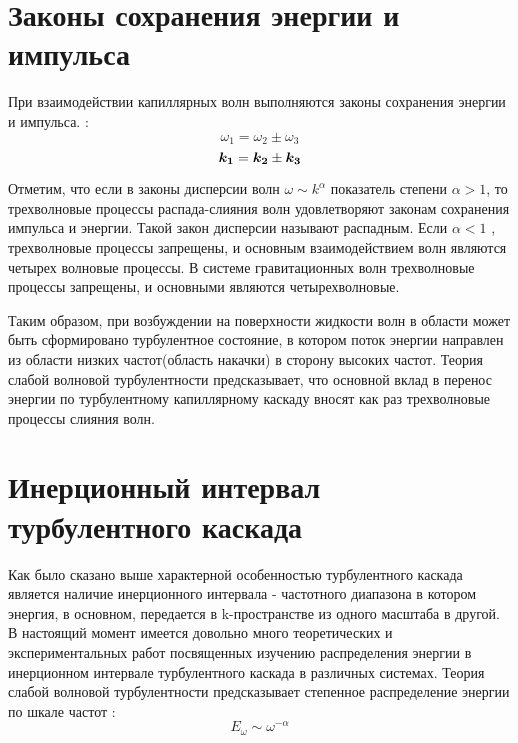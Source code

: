 \section{Законы сохранения энергии и импульса} %

При взаимодействии капиллярных волн выполняются законы сохранения энергии и импульса. :
\begin{equation}
 \label{eq:saveOmega}
\omega_1 = \omega_2 \pm \omega_3
\end{equation}
\begin{equation}
 \label{eq:saveK}
\mbox{\boldmath$k_1$} = \mbox{\boldmath$k_2$} \pm \mbox{\boldmath$k_3$}
\end{equation}

Отметим, что если в законы дисперсии волн $\omega \sim k ^ \alpha$ показатель степени $\alpha > 1$, то трехволновые процессы распада-слияния волн удовлетворяют законам сохранения импульса и энергии. Такой закон дисперсии называют распадным. Если $\alpha < 1$ , трехволновые процессы запрещены, и основным взаимодействием волн являются четырех волновые процессы. В системе гравитационных волн трехволновые процессы запрещены, и основными являются четырехволновые. 

Таким образом, при возбуждении на поверхности жидкости волн в области может быть сформировано турбулентное состояние, в котором поток энергии направлен из области низких частот(область накачки) в сторону высоких частот. Теория слабой волновой турбулентности \cite{Zakharov} предсказывает, что основной вклад в перенос энергии по турбулентному капиллярному каскаду вносят как раз трехволновые процессы слияния волн. 


\section{Инерционный интервал турбулентного каскада}%

Как было сказано выше характерной особенностью турбулентного каскада является наличие инерционного интервала -  частотного диапазона в котором энергия, в основном, передается в k-пространстве из одного масштаба в другой. 
В настоящий момент имеется довольно много теоретических и экспериментальных работ посвященных изучению распределения энергии в инерционном интервале турбулентного каскада в различных системах. Теория слабой волновой турбулентности предсказывает степенное распределение энергии по шкале частот \cite{Zakharov}:
\begin{equation}
\label{eq:EOmega}
E_\omega \sim \omega^{-\alpha}
\end{equation}

